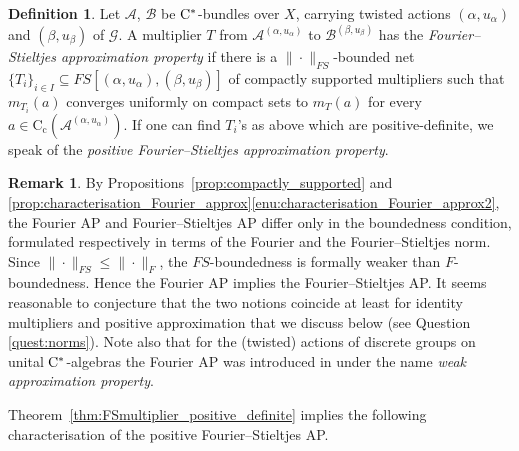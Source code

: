 \documentclass[11 pt, leqno]{amsart}
\numberwithin{equation}{section}
\theoremstyle{plain}
\theoremstyle{definition}
\newtheorem {defn}[thm] {Definition}
\newtheorem {rem} [thm]{Remark}
\newcommand*{\contc}{\mathrm{C_c}}%
\newcommand{\B}{\mathcal B}
\newcommand{\m}{m}
\newcommand{\G}{\mathcal G} %
\newcommand{\A}{\mathcal A}
\newcommand{\cst}{\ifmmode\mathrm{C}^*\else{$\mathrm{C}^*$}\fi}
\begin{document}
\begin{defn}\label{def:weak_approximation_property}
Let $\A$, $\B$  be $\cst$-bundles over $X$, carrying twisted actions $(\alpha,u_\alpha)$ and $(\beta,u_\beta)$ of $\G$. 
A multiplier $T$ from $\A^{(\alpha,u_{\alpha})}$ to $\B^{(\beta,u_{\beta})}$ has the \emph{Fourier--Stieltjes approximation property} if there is a $\|\cdot\|_{FS}$-bounded net $\{T_{i}\}_{i\in I}\subseteq FS[(\alpha,u_{\alpha}),(\beta,u_{\beta})]$ of compactly supported multipliers such that $\m_{T_i}(a)$ converges uniformly on compact sets to $\m_{T}(a)$ for every $a\in\contc(\A^{(\alpha,u_{\alpha})})$.  
If one can find $T_i$'s as above which are positive-definite, we speak of the \emph{positive Fourier--Stieltjes approximation property}. 
\end{defn}

\begin{rem}
By Propositions~\ref{prop:compactly_supported} and \ref{prop:characterisation_Fourier_approx}\ref{enu:characterisation_Fourier_approx2}, the Fourier AP and Fourier--Stieltjes AP differ only in the boundedness condition, formulated respectively in terms of the Fourier and the Fourier--Stieltjes norm. 
Since $\|\cdot\|_{FS}\leq \|\cdot\|_{F}$, the $FS$-boundedness is  formally weaker than $F$-boundedness. 
Hence the Fourier AP implies the Fourier--Stieltjes AP. 
It seems reasonable to conjecture that the two notions coincide at least for identity multipliers and positive approximation that we discuss below (see Question \ref{quest:norms}). 
Note also that for the (twisted) actions of discrete groups on unital $\cst$-algebras the Fourier AP was introduced in \cite{BedosContiregular} under the name \emph{weak approximation property}.
\end{rem}

Theorem~\ref{thm:FSmultiplier_positive_definite} implies the following characterisation of the positive Fourier--Stieltjes AP. 
\end{document}
